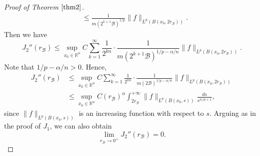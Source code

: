 \documentclass[10pt, reqno]{amsart}
\theoremstyle{definition}
\theoremstyle{remark}
\numberwithin{equation}{section}
\begin{document}
\begin{proof}[Proof of Theorem $\ref{thm2}$]
\begin{equation*}
\begin{split}
&\leq\frac{1}{m(2^{k+1}\mathcal{B})^{1/p}}\big\|f\big\|_{L^p(B(x_0,2r_{\mathcal{B}}))}.
\end{split}
\end{equation*}
Then we have
\begin{equation*}
J_2''(r_{\mathcal{B}})\leq \sup_{x_0\in\mathbb R^n}
C\sum_{k=1}^{\infty}\frac{1}{2^{kn}}\cdot\frac{1}{m(2^{k+1}\mathcal{B})^{1/p-\alpha/n}}\big\|f\big\|_{L^p(B(x_0,2r_{\mathcal{B}}))}.
\end{equation*}
Note that $1/p-\alpha/n>0$. Hence,
\begin{equation*}
\begin{split}
J_2''(r_{\mathcal{B}})&\leq \sup_{x_0\in\mathbb R^n}
C\sum_{k=1}^{\infty}\frac{1}{2^{kn}}\cdot\frac{1}{m(2\mathcal{B})^{1/p-\alpha/n}}\big\|f\big\|_{L^p(B(x_0,2r_{\mathcal{B}}))}\\
&\leq \sup_{x_0\in\mathbb R^n} C(r_{\mathcal{B}})^{\alpha}\int_{2r_{\mathcal{B}}}^{+\infty}\big\|f\big\|_{L^p(B(x_0,s))}\frac{ds}{s^{n/p+1}},
\end{split}
\end{equation*}
since $\|f\|_{L^p(B(x_0,s))}$ is an increasing function with respect to $s$. Arguing as in the proof of $J_1$, we can also obtain
\begin{equation*}
\lim_{r_{\mathcal{B}}\to 0^{+}}J_2''(r_{\mathcal{B}})=0.
\end{equation*}


\end{proof}
\end{document}
